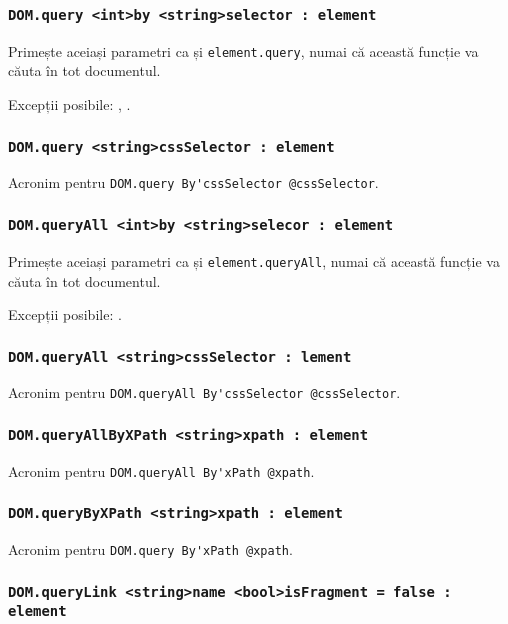 \subsubsection{\lstinline|DOM.query <int>by <string>selector : element|}

Primește aceiași parametri ca și  \lstinline|element.query|, numai că această funcție va căuta în tot documentul.

Excepții posibile: , .

\subsubsection{\lstinline|DOM.query <string>cssSelector : element|}

Acronim pentru \lstinline|DOM.query By'cssSelector @cssSelector|.

\subsubsection{\lstinline|DOM.queryAll <int>by <string>selecor : element|}

Primește aceiași parametri ca și \lstinline|element.queryAll|, numai că această funcție va căuta în tot documentul.

Excepții posibile: .

\subsubsection{\lstinline|DOM.queryAll <string>cssSelector : lement|}

Acronim pentru \lstinline|DOM.queryAll By'cssSelector @cssSelector|.

\subsubsection{\lstinline|DOM.queryAllByXPath <string>xpath : element|}

Acronim pentru \lstinline|DOM.queryAll By'xPath @xpath|.

\subsubsection{\lstinline|DOM.queryByXPath <string>xpath : element|}

Acronim pentru \lstinline|DOM.query By'xPath @xpath|.

\subsubsection{\lstinline|DOM.queryLink <string>name <bool>isFragment = false : element|}

